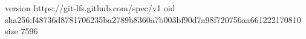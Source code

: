 version https://git-lfs.github.com/spec/v1
oid sha256:f48736d8781706235ba2789b8360a7b003bf90d7a98f720756aa661222170810
size 7596
